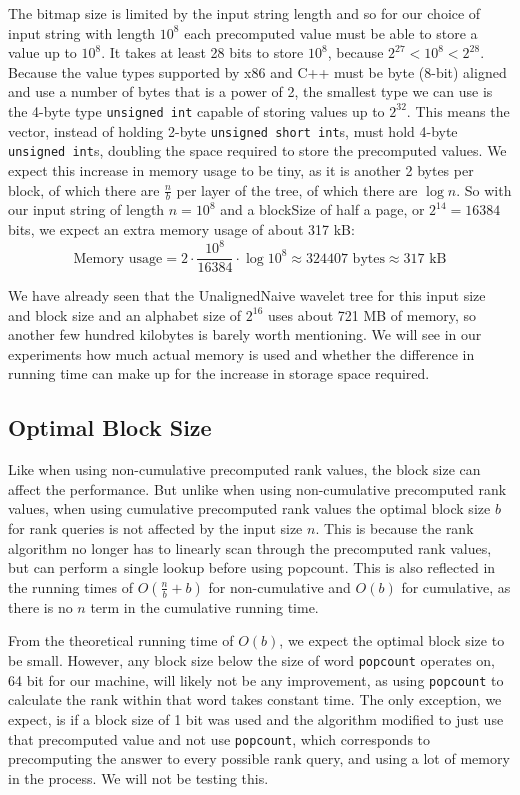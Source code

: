 The bitmap size is limited by the input string length and so for our choice of input string with length $10^8$ each precomputed value must be able to store a value up to $10^8$.
It takes at least 28 bits to store $10^8$, because $2^{27} < 10^8 < 2^{28}$.
Because the value types supported by x86 and C++ must be byte (8-bit) aligned and use a number of bytes that is a power of 2, the smallest type we can use is the 4-byte type \texttt{unsigned int} capable of storing values up to $2^{32}$.
This means the vector, instead of holding 2-byte \texttt{unsigned short int}s, must hold 4-byte \texttt{unsigned int}s, doubling the space required to store the precomputed values.
We expect this increase in memory usage to be tiny, as it is another 2 bytes per block, of which there are $\frac{n}{b}$ per layer of the tree, of which there are $\log n$.
So with our input string of length $n = 10^8$ and a blockSize of half a page, or $2^{14} = 16384$ bits, we expect an extra memory usage of about 317 kB:
\[\text{Memory usage} = 2 \cdot \frac{10^8}{16384} \cdot \log 10^8 \approx 324407 \text{ bytes} \approx 317 \text{ kB} \]

We have already seen that the UnalignedNaive wavelet tree for this input size and block size and an alphabet size of $2^{16}$ uses about 721 MB of memory, so another few hundred kilobytes is barely worth mentioning.
We will see in our experiments how much actual memory is used and whether the difference in running time can make up for the increase in storage space required.

\subsection{Optimal Block Size}
Like when using non-cumulative precomputed rank values, the block size can affect the performance.
But unlike when using non-cumulative precomputed rank values, when using cumulative precomputed rank values the optimal block size $b$ for rank queries is not affected by the input size $n$.
This is because the rank algorithm no longer has to linearly scan through the precomputed rank values, but can perform a single lookup before using popcount.
This is also reflected in the running times of $O(\frac{n}{b} + b)$ for non-cumulative and $O(b)$ for cumulative, as there is no $n$ term in the cumulative running time.

From the theoretical running time of $O(b)$, we expect the optimal block size to be small.
However, any block size below the size of word \texttt{popcount} operates on, 64 bit for our machine, will likely not be any improvement, as using \texttt{popcount} to calculate the rank within that word takes constant time.
The only exception, we expect, is if a block size of 1 bit was used and the algorithm modified to just use that precomputed value and not use \texttt{popcount}, which corresponds to precomputing the answer to every possible rank query, and using a lot of memory in the process.
We will not be testing this.

